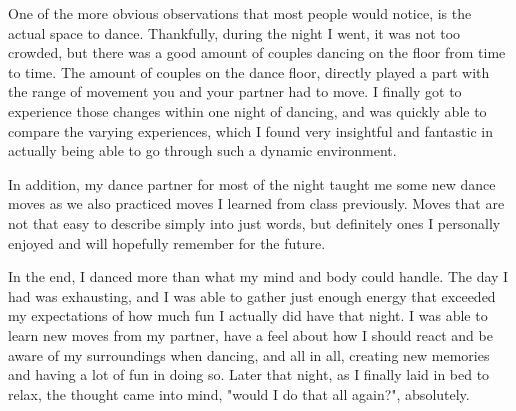 \documentclass[letterpaper,12pt,onecolumn]{IEEEtran}
\begin{document}
One of the more obvious observations that most people would notice, is the actual space to dance. Thankfully, during the night I went, it was not too crowded, but there was a good amount of couples dancing on the floor from time to time. The amount of couples on the dance floor, directly played a part with the range of movement you and your partner had to move. I finally got to experience those changes within one night of dancing, and was quickly able to compare the varying experiences, which I found very insightful and fantastic in actually being able to go through such a dynamic environment.

In addition, my dance partner for most of the night taught me some new dance moves as we also practiced moves I learned from class previously. Moves that are not that easy to describe simply into just words, but definitely ones I personally enjoyed and will hopefully remember for the future. 

In the end, I danced more than what my mind and body could handle. The day I had was exhausting, and I was able to gather just enough energy that exceeded my expectations of how much fun I actually did have that night. I was able to learn new moves from my partner, have a feel about how I should react and be aware of my surroundings when dancing, and all in all, creating new memories and having a lot of fun in doing so. Later that night, as I finally laid in bed to relax, the thought came into mind, "would I do that all again?", absolutely.
\end{document}

